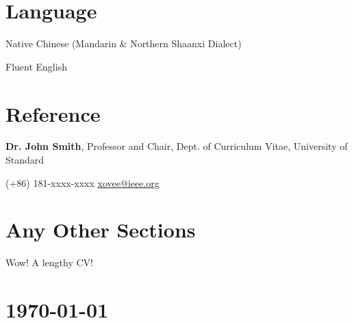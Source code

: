 \documentclass{article}
\newcommand{\cvsection}[1]{\section*{\rmfamily#1}}
\begin{document}







\cvsection{Language}
\indent

Native Chinese (Mandarin \& Northern Shaanxi Dialect)

Fluent English




\cvsection{Reference}
\indent

\textbf{Dr. John Smith}, Professor and Chair, Dept. of Curriculum Vitae, University of Standard

\hspace{2em}(+86) 181-xxxx-xxxx \hspace{2em} \url{xovee@ieee.org}


\cvsection{Any Other Sections}
\indent 

Wow! A lengthy CV!


\vfill

\section*{\hfill\color{OliveGreen}\today}
\end{document}
